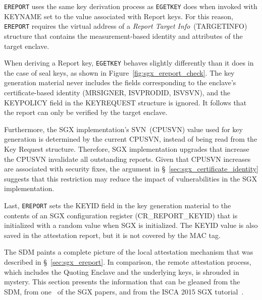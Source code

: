 \texttt{EREPORT} uses the same key derivation process as \texttt{EGETKEY}
does when invoked with KEYNAME set to the value associated with Report keys.
For this reason, \texttt{EREPORT} requires the virtual address of a
\textit{Report Target Info}~(TARGETINFO) structure that contains the
measurement-based identity and attributes of the target enclave.


When deriving a Report key, \texttt{EGETKEY} behaves slightly differently than
it does in the case of seal keys, as shown in
Figure~\ref{fig:sgx_ereport_check}. The key generation material never includes
the fields corresponding to the enclave's certificate-based identity (MRSIGNER,
ISVPRODID, ISVSVN), and the KEYPOLICY field in the KEYREQUEST structure is
ignored. It follows that the report can only be verified by the target enclave.

Furthermore, the SGX implementation's SVN~(CPUSVN) value used for key generation
is determined by the current CPUSVN, instead of being read from the Key Request
structure. Therefore, SGX implementation upgrades that increase the CPUSVN
invalidate all outstanding reports. Given that CPUSVN increases are associated
with security fixes, the argument in \S~\ref{sec:sgx_certificate_identity}
suggests that this restriction may reduce the impact of vulnerabilities in the
SGX implementation.

Last, \texttt{EREPORT} sets the KEYID field in the key generation material to
the contents of an SGX configuration register (CR\_REPORT\_KEYID) that is
initialized with a random value when SGX is initialized. The KEYID value is
also saved in the attestation report, but it is not covered by the MAC tag.



\label{sec:sgx_quoting_enclave}

The SDM paints a complete picture of the local attestation mechanism that was
described in \S~\ref{sec:sgx_ereport}. In comparison, the remote attestation
process, which includes the Quoting Enclave and the underlying keys, is
shrouded in mystery. This section presents the information that can be gleaned
from the SDM, from one~\cite{anati2013sgx} of the SGX papers, and from the ISCA
2015 SGX tutorial~\cite{intel2015iscasgx}.

